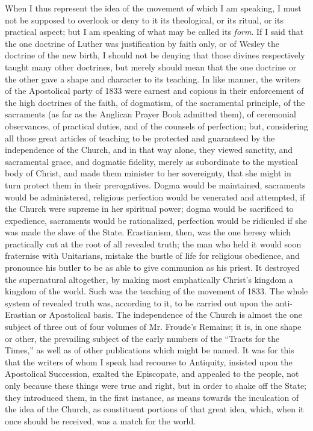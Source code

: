 When I thus represent the idea of the movement of which I am
speaking, I must not be supposed to overlook or deny to it its
theological, or its ritual, or its practical aspect; but I am speaking
of what may be called its \emph{form}. If I said that the one doctrine
of Luther was justification by faith only, or of Wesley the doctrine
of the new birth, I should not be denying that those divines
respectively taught many other doctrines, but merely should mean that
the one doctrine or the other gave a shape and character to its
teaching. In like manner, the writers of the Apostolical party of 1833
were earnest and copious in their enforcement of the high doctrines of
the faith, of dogmatism, of the sacramental principle, of the
sacraments (as far as the Anglican Prayer Book admitted them), of
ceremonial observances, of practical duties, and of the counsels of
perfection; but, considering all those great articles of teaching to
be protected and guaranteed by the independence of the Church, and in
that way alone, they viewed sanctity, and sacramental grace, and
dogmatic fidelity, merely as subordinate to the mystical body of
Christ, and made them minister to her sovereignty, that she might in
turn protect them in their prerogatives. Dogma would be maintained,
sacraments would be administered, religious perfection would be
venerated and attempted, if the Church were supreme in her spiritual
power; dogma would be sacrificed to expedience, sacraments would be
rationalized, perfection would be ridiculed if she was made the slave
of the State. Erastianism, then, was the one heresy which practically
cut at the root of all revealed truth; the man who held it would soon
fraternise with Unitarians, mistake the bustle of life for religious
obedience, and pronounce his butler to be as able to give communion as
his priest. It destroyed the supernatural altogether, by making most
emphatically Christ's kingdom a kingdom of the world. Such was the
teaching of the movement of 1833. The whole system of revealed truth
was, according to it, to be carried out upon the anti-Erastian or
Apostolical basis. The independence of the Church is almost the one
subject of three out of four volumes of Mr. Froude's Remains; it is,
in one shape or other, the prevailing subject of the early numbers of
the ``Tracts for the Times,'' as well as of other publications
which might be named. It was for this that the writers of whom I speak
had recourse to Antiquity, insisted upon the Apostolical Succession,
exalted the Episcopate, and appealed to the people, not only because
these things were true and right, but in order to shake off the State;
they introduced them, in the first instance, as means towards the
inculcation of the idea of the Church, as constituent portions of that
great idea, which, when it once should be received, was a match for
the world.

